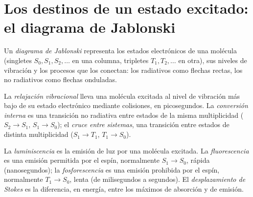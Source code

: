 \section{Los destinos de un estado excitado: el diagrama de Jablonski}

\begin{definition}\label{def:b3:electronic-spectroscopy:jablonski}
Un \emph{diagrama de Jablonski} representa los estados electrónicos
de una molécula (singletes $S_0, S_1, S_2, \dots$ en una columna, tripletes $T_1, T_2,
\dots$ en otra), sus niveles de vibración y los procesos que los conectan:
los radiativos como flechas rectas, los no radiativos como flechas onduladas.
\end{definition}

\begin{definition}\label{def:b3:electronic-spectroscopy:radiationless}
La \emph{relajación vibracional} lleva una molécula
excitada al nivel de vibración más bajo de su estado electrónico mediante
colisiones, en picosegundos. La \emph{conversión interna}
es una transición no radiativa entre estados de la misma
multiplicidad ($S_2 \to S_1$, $S_1 \to S_0$); el \emph{cruce entre
sistemas}, una transición entre estados de distinta
multiplicidad ($S_1 \to T_1$, $T_1 \to S_0$).
\end{definition}

\begin{definition}\label{def:b3:electronic-spectroscopy:luminescence}
La \emph{luminiscencia} es la emisión de luz por una molécula
excitada. La \emph{fluorescencia} es una emisión permitida por el espín,
normalmente $S_1 \to S_0$, rápida (nanosegundos); la \emph{fosforescencia}
es una emisión prohibida por el espín, normalmente $T_1 \to S_0$, lenta (de milisegundos a
segundos). El \emph{desplazamiento de Stokes} es la diferencia,
en energía, entre los máximos de absorción y de emisión.
\end{definition}

